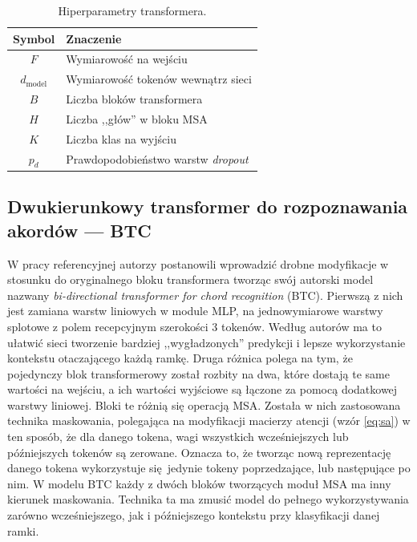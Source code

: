\begin{table}
    \centering
    \caption{Hiperparametry transformera.}
    \label{tab:transformer_params}
    \begin{tabular}{|c|l|} \hline
        Symbol & Znaczenie \\ \hline
        $F$ & Wymiarowość na wejściu \\
        $d_{\mathrm{model}}$ & Wymiarowość tokenów wewnątrz sieci \\
        $B$ & Liczba bloków transformera \\
        $H$ & Liczba ,,głów'' w bloku MSA \\
        $K$ & Liczba klas na wyjściu \\
        $p_d$ & Prawdopodobieństwo warstw \emph{dropout} \\ \hline
    \end{tabular}
\end{table}

\subsection{Dwukierunkowy transformer do rozpoznawania akordów --- BTC}

W pracy referencyjnej \cite{park_bi-directional_2019} autorzy postanowili wprowadzić drobne
modyfikacje w stosunku do oryginalnego bloku transformera tworząc swój autorski model nazwany
\emph{bi-directional transformer for chord recognition} (BTC). Pierwszą z nich jest zamiana warstw
liniowych w module MLP, na jednowymiarowe warstwy splotowe z polem recepcyjnym szerokości 3 tokenów.
Według autorów ma to ułatwić sieci tworzenie bardziej ,,wygładzonych'' predykcji i lepsze
wykorzystanie kontekstu otaczającego każdą ramkę. Druga różnica polega na tym, że pojedynczy blok
transformerowy został rozbity na dwa, które dostają te same wartości na wejściu, a ich wartości
wyjściowe są łączone za pomocą dodatkowej warstwy liniowej. Bloki te różnią się operacją MSA.
Została w nich zastosowana technika maskowania, polegająca na modyfikacji macierzy atencji (wzór
\ref{eq:sa}) w ten sposób, że dla danego tokena, wagi wszystkich wcześniejszych lub późniejszych
tokenów są zerowane. Oznacza to, że tworząc nową reprezentację danego tokena wykorzystuje
się jedynie tokeny poprzedzające, lub następujące po nim. W modelu BTC każdy z dwóch bloków
tworzących moduł MSA ma inny kierunek maskowania. Technika ta ma zmusić model do pełnego
wykorzystywania zarówno wcześniejszego, jak i późniejszego kontekstu przy klasyfikacji danej ramki.



